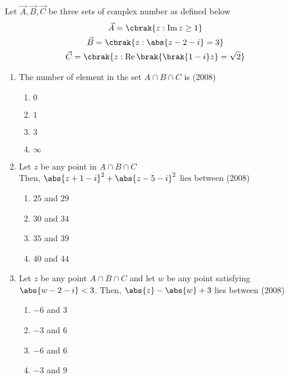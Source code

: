 \iffalse
	\title{Assignment}
	\author{Shreyansh Sonkar - ai24btech11032}
	\section{paragraph}
\fi
\setcounter{enumi}{0}
\item Let $ \vec{A}, \vec{B}, \vec{C}$ be three sets of complex number as defined below
\begin{gather*}
        \vec{A} = \cbrak{ z :\operatorname{Im}z\geq1}\\
        \vec{B}=\cbrak{z:\abs{z-2-i}=3}\\
        \vec{C}=\cbrak{ z : \operatorname{Re} \brak{\brak{1-i}z} = \sqrt{2}}
\end{gather*}
\begin{enumerate}
    \item The number of element in the set $A \cap {B} \cap {C}$ is
        \hfill (2008)

		\begin{multicols}{4}
			\begin{enumerate}
				\item $0$ 
				\item $1$
				\item $3$
				\item $\infty$
			\end{enumerate}
		\end{multicols}

    \item Let $z$ be any point in $A\cap{B}\cap{C}$ \\ Then, $\abs{z+1-i}^{2}+\abs{z-5-i}^{2}$ lies between
        \hfill (2008)

		\begin{multicols}{2}
			\begin{enumerate}
				\item $25$  and  $29$ 
				\item $30$ and $34$
				\item $35$ and $39$
				\item $40$ and $44$
			\end{enumerate}
		\end{multicols}
  
    \item Let $z$ be any point $A\cap{B}\cap{C}$ and let $w$ be any point satisfying $\abs{w-2-i}<3$. Then, $\abs{z}-\abs{w}+3$ lies between
        \hfill (2008)

		\begin{multicols}{2}
			\begin{enumerate}
				\item $-6$  and  $3$ 
				\item $-3$ and $6$
				\item $-6$ and $6$
				\item $-3$ and $9$
			\end{enumerate}
		\end{multicols}
  
\end{enumerate}
